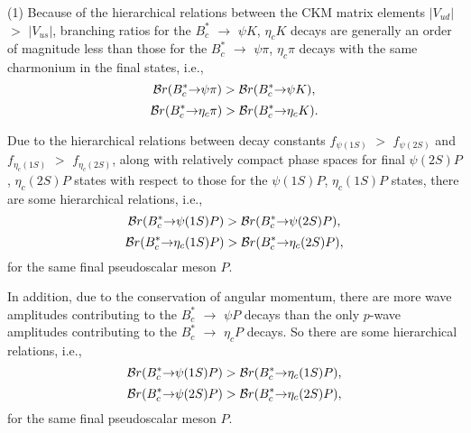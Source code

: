 \documentclass[preprint,superscriptaddress,nofootinbib]{revtex4}
\begin{document}
  (1)
  Because of the hierarchical relations between the CKM matrix elements
  ${\vert}V_{ud}{\vert}$ $>$ ${\vert}V_{us}{\vert}$,
  branching ratios for the $B_{c}^{\ast}$ ${\to}$ ${\psi}K$, ${\eta}_{c}K$
  decays are generally an order of magnitude less than those for
  the $B_{c}^{\ast}$ ${\to}$ ${\psi}{\pi}$, ${\eta}_{c}{\pi}$ decays
  with the same charmonium in the final states, i.e.,
   \begin{equation}
  {\cal B}r(B_{c}^{{\ast}}{\to}{\psi}{\pi})  >
  {\cal B}r(B_{c}^{{\ast}}{\to}{\psi}K)
   \label{r-01-01},
   \end{equation}
   \begin{equation}
  {\cal B}r(B_{c}^{{\ast}}{\to}{\eta}_{c}{\pi})  >
  {\cal B}r(B_{c}^{{\ast}}{\to}{\eta}_{c}K)
   \label{r-01-02}.
   \end{equation}

  Due to the hierarchical relations between decay constants
  $f_{{\psi}(1S)}$ $>$ $f_{{\psi}(2S)}$ and
  $f_{{\eta}_{c}(1S)}$ $>$ $f_{{\eta}_{c}(2S)}$, along with relatively
  compact phase spaces for final ${\psi}(2S)P$, ${\eta}_{c}(2S)P$ states
  with respect to those for the ${\psi}(1S)P$, ${\eta}_{c}(1S)P$ states,
  there are some hierarchical relations, i.e.,
   \begin{equation}
  {\cal B}r(B_{c}^{{\ast}}{\to}{\psi}(1S)P)  >
  {\cal B}r(B_{c}^{{\ast}}{\to}{\psi}(2S)P)
   \label{r-01-03},
   \end{equation}
   \begin{equation}
  {\cal B}r(B_{c}^{{\ast}}{\to}{\eta}_{c}(1S)P)  >
  {\cal B}r(B_{c}^{{\ast}}{\to}{\eta}_{c}(2S)P)
   \label{r-01-04},
   \end{equation}
  for the same final pseudoscalar meson $P$.

  In addition, due to the conservation of angular momentum, there are
  more wave amplitudes contributing to the $B_{c}^{{\ast}}$ ${\to}$
  ${\psi}P$ decays than the only $p$-wave amplitudes contributing to
  the $B_{c}^{{\ast}}$ ${\to}$ ${\eta}_{c}P$ decays.
  So there are some hierarchical relations, i.e.,
   \begin{equation}
  {\cal B}r(B_{c}^{{\ast}}{\to}{\psi}(1S)P)  >
  {\cal B}r(B_{c}^{{\ast}}{\to}{\eta}_{c}(1S)P)
   \label{r-01-05},
   \end{equation}
   \begin{equation}
  {\cal B}r(B_{c}^{{\ast}}{\to}{\psi}(2S)P)  >
  {\cal B}r(B_{c}^{{\ast}}{\to}{\eta}_{c}(2S)P)
   \label{r-01-06},
   \end{equation}
  for the same final pseudoscalar meson $P$.
\end{document}
